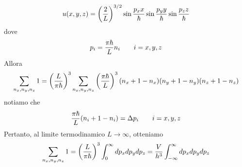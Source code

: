 \documentclass{article}
\begin{document}
\begin{align}
    u(x, y, z) = \left(\frac{2}{L}\right)^{3/2}\sin\frac{p_x x}{\hbar}\sin\frac{p_y y}{\hbar}\sin\frac{p_z z}{\hbar} \notag
\end{align}
dove 
\begin{align}
    p_i = \frac{\pi\hbar}{L}n_i \qquad i = x, y, z \notag
\end{align}
Allora
\begin{align}
    \sum_{n_x, n_y, n_z} 1 = \left(\frac{L}{\pi\hbar}\right)^{3}\sum_{n_x, n_y, n_z}\left(\frac{\pi\hbar}{L}\right)^{3}(n_x + 1 - n_x)(n_y + 1 - n_y)(n_z + 1 - n_z) \notag
\end{align}
notiamo che 
\begin{align}
    \frac{\pi\hbar}{L}(n_i + 1 - n_i) = \Delta p_i \qquad i = x, y, z \notag
\end{align}
Pertanto, al limite termodinamico $L \rightarrow \infty$, otteniamo
\begin{align}
    \sum_{n_x, n_y, n_z} 1 = \left(\frac{L}{\pi\hbar}\right)^3\int_0^\infty dp_xdp_ydp_z = \frac{V}{h^3}\int_{-\infty}^\infty dp_xdp_ydp_z \notag
\end{align}
\end{document}
